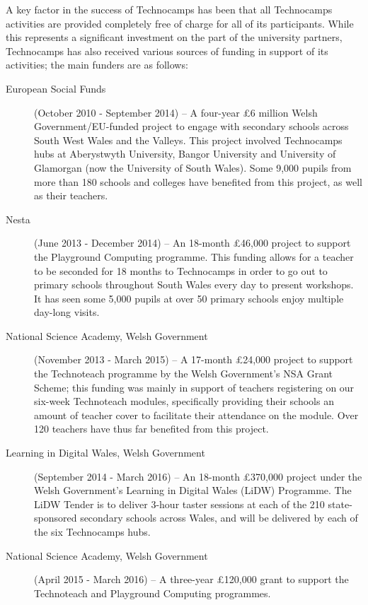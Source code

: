 A key factor in the success of Technocamps has been that all
Technocamps activities are provided completely free of charge for all
of its participants. While this represents a significant investment on
the part of the university partners, Technocamps has also received
various sources of funding in support of its activities; the main
funders are as follows:

\begin{description}
\item[European Social Funds] (October 2010 - September 2014) --
A four-year \pounds 6 million Welsh Government/EU-funded project to
engage with secondary schools across South West Wales and the
Valleys. This project involved Technocamps hubs at Aberystwyth
University, Bangor University and University of Glamorgan (now the
University of South Wales). Some 9,000 pupils from more than 180
schools and colleges have benefited from this project, as well as
their teachers.

\item[Nesta] (June 2013 - December 2014) --
An 18-month \pounds 46,000 project to support the Playground Computing
programme. This funding allows for a teacher to be seconded for 18
months to Technocamps in order to go out to primary schools throughout
South Wales every day to present workshops. It has seen some 5,000
pupils at over 50 primary schools enjoy multiple day-long visits.

\item[National Science Academy, Welsh Government] (November 2013 - March 2015) --
A 17-month \pounds 24,000 project to support the Technoteach programme
by the Welsh Government's NSA Grant Scheme; this funding was mainly in
support of teachers registering on our six-week Technoteach modules,
specifically providing their schools an amount of teacher cover to
facilitate their attendance on the module. Over 120 teachers have thus
far benefited from this project.

\item[Learning in Digital Wales, Welsh Government] (September 2014 - March 2016) --
An 18-month \pounds 370,000 project under the Welsh Government's
Learning in Digital Wales (LiDW) Programme. The LiDW Tender is to
deliver 3-hour taster sessions at each of the 210 state-sponsored
secondary schools across Wales, and will be delivered by each of the
six Technocamps hubs.

\item[National Science Academy, Welsh Government] (April 2015 - March 2016) -- 
A three-year \pounds 120,000 grant to support the Technoteach and
Playground Computing programmes.
\end{description}

